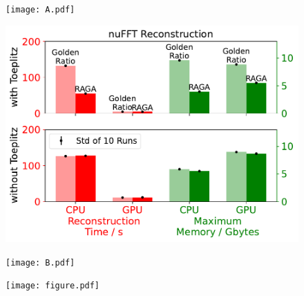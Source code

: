 \documentclass[preview]{standalone}
\begin{document}
\begin{minipage}{.04\textwidth}
	\begin{figure}
		\centering
		\texttt{[image: A.pdf]}\vspace*{4cm}
	\end{figure}
\end{minipage}
\hspace*{-0.5cm}
\begin{minipage}{.48\textwidth}
	\begin{figure}
		\centering
		\includegraphics[align=c,width=\textwidth]{../05a_speedup_num_error/figure_ref.pdf}
	\end{figure}
\end{minipage}
\hspace*{0.3cm}
\begin{minipage}{.04\textwidth}
	\begin{figure}
		\centering
		\texttt{[image: B.pdf]}\vspace*{4cm}
	\end{figure}
\end{minipage}
\hspace*{-0.5cm}
\begin{minipage}{.38\textwidth}
	\begin{figure}
		\centering
		\texttt{[image: figure.pdf]}
	\end{figure}
\end{minipage}




\end{document}
